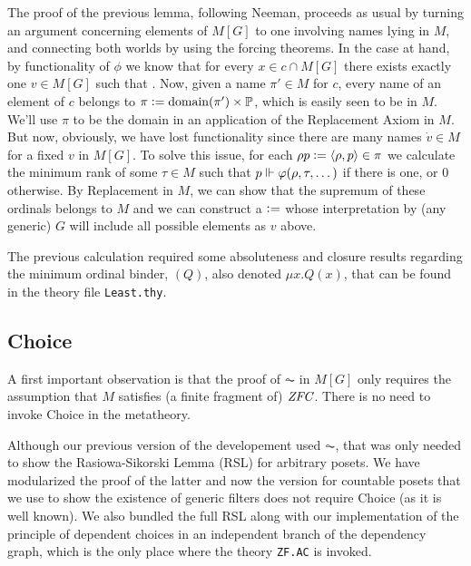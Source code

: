 The proof of the previous lemma, following Neeman, proceeds as usual
by turning an argument concerning elements of $M[G]$ to one involving
names lying in $M$, and connecting both worlds by using the forcing
theorems. In the case at hand, by functionality of $\phi$ we know that
for every $x\in c\cap M[G]$ there exists exactly one $v\in M[G]$ such
that
. Now,
given a name $\pi'\in M$ for $c$, every name of an element of $c$
belongs to $\pi\mathrel{\mathop:}= \operatorname{domain}(\pi')\times \mathbb{P}$, which is easily seen to be
in $M$. We'll use $\pi$ to be the domain in an application of the
Replacement Axiom in $M$. But now, obviously, we have lost
functionality since there are many names $\dot v\in M$ for a fixed $v$
in $M[G]$. To solve this issue, for each $\rho p \mathrel{\mathop:}=\langle\rho,p\rangle\in
\pi$ we calculate the
minimum rank of some $\tau\in M$ such that 
$p\Vdash \varphi(\rho,\tau,\dots)$ if there is one, or $0$ otherwise. By
Replacement in $M$, we can show that the supremum  of these ordinals
belongs to $M$ and we can construct a  $\mathrel{\mathop:}=$ 
whose interpretation by (any generic) $G$ will include all possible elements
as $v$ above.

The previous calculation required some absoluteness and closure
results regarding the minimum ordinal binder, $(Q)$, also
denoted $\mu x. Q(x)$, that can be found in the theory file
\verb|Least.thy|.

\subsection{Choice}
A first important observation is that the proof of $\AC$ in $M[G]$
only requires the assumption that $M$ satisfies (a finite fragment of)
$\mathit{ZFC}$. There is no need to invoke Choice in the metatheory.

Although our previous version of the developement used $\AC$, that was
only needed to show the Rasiowa-Sikorski Lemma (RSL) for
arbitrary posets. We have modularized the proof of the latter
and now the version for countable posets that we use to show the
existence of generic filters
does not require Choice (as it is well known). We also bundled the
full RSL along with our implementation of the principle of dependent
choices in an independent branch of the dependency graph, which is the
only place where the theory \texttt{ZF.AC} is invoked.

